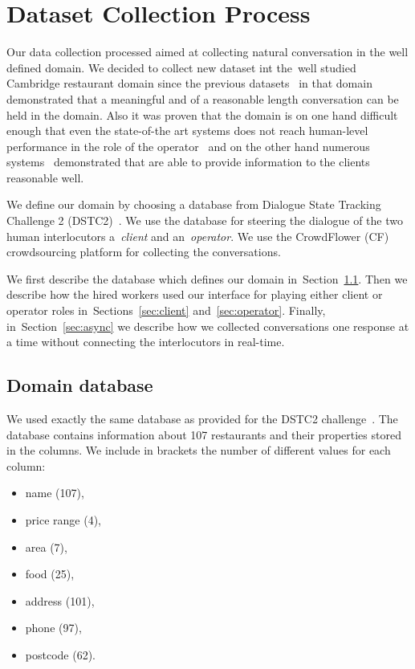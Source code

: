 \documentclass[runningheads,a4paper]{llncs}
\begin{document}
\section{Dataset Collection Process} \label{sec:collection}
\vspace{-0.50em}
Our data collection processed aimed at collecting natural conversation in the well defined domain.
We decided to collect new dataset int the~well studied Cambridge restaurant domain since the previous datasets~\cite{williams2013dstc1,henderson2014dstc2,henderson2014dstc3} in that domain demonstrated that a meaningful and of a reasonable length conversation can be held in the domain.
Also it was proven that the domain is on one hand difficult enough that even the state-of-the art systems does not reach human-level performance in the role of the operator~\cite{henderson2014dstc2} and on the other hand numerous systems~\cite{young2010hidden,gasic2011line,wen2016network} demonstrated that are able to provide information to the clients reasonable well.

We define our domain by choosing a database from Dialogue State Tracking Challenge 2 (DSTC2)~\cite{henderson2014dstc2}.
We use the database for steering the dialogue of the two human interlocutors a~{\it client} and an~{\it operator}.
We use the CrowdFlower (CF) crowdsourcing platform for collecting the conversations.

We first describe the database which defines our domain in~Section~\ref{sec:db}.
Then we describe how the hired workers used our interface for playing either client or operator roles in~Sections~\ref{sec:client} and~\ref{sec:operator}.
Finally, in~Section~\ref{sec:async} we describe how we collected conversations one response at a time without connecting the interlocutors in real-time. 

\vspace{-1.00em}
\subsection{Domain database}
\label{sec:db}

We used exactly the same database as provided for the DSTC2 challenge~\cite{henderson2014dstc2}.
The database contains information about 107 restaurants and their properties stored in the columns.
We include in brackets the number of different values for each column:
\vspace{-0.50em}
\begin{itemize}  %
    \item name (107),
    \item price range (4),
    \item area (7),
    \item food (25),
    \item address (101),
    \item phone (97),
    \item postcode (62).
\end{itemize}
\vspace{-0.50em}
\end{document}

